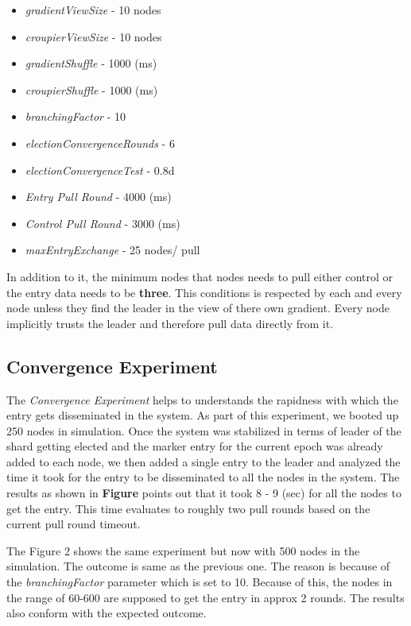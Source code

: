 \documentclass[a4paper, 11pt]{article}
\begin{document}
\begin{itemize}
\setlength\itemsep{0em}
\item \textit{gradientViewSize} - 10 nodes
\item \textit{croupierViewSize} - 10 nodes
\item \textit{gradientShuffle} - 1000 (ms)
\item \textit{croupierShuffle} - 1000 (ms)
\item \textit{branchingFactor} - 10
\item \textit{electionConvergenceRounds} - 6
\item \textit{electionConvergenceTest} - 0.8d
\item \textit{Entry Pull Round} - 4000 (ms)
\item \textit{Control Pull Round} - 3000 (ms)
\item \textit{maxEntryExchange} - 25 nodes/ pull
\end{itemize}

In addition to it, the minimum nodes that nodes needs to pull either control or the entry data needs to be \textbf{three}. This conditions is respected by each and every node unless they find the leader in the view of there own gradient. Every node implicitly trusts the leader and therefore pull data directly from it.




\subsection{Convergence Experiment}

The \textit{Convergence Experiment} helps to understands the rapidness with which the entry gets disseminated in the system. As part of this experiment, we booted up 250 nodes in simulation. Once the system was stabilized in terms of leader of the shard getting elected and the marker entry for the current epoch was already added to each node, we then added a single entry to the leader and analyzed the time it took for the entry to be disseminated to all the nodes in the system. The results as shown in \textbf{Figure} points out that it took 8 - 9 (sec) for all the nodes to get the entry. This time evaluates to roughly two pull rounds based on the current pull round timeout.


The Figure 2 shows the same experiment but now with 500 nodes in the simulation. The outcome is same as the previous one. The reason is because of the \textit{branchingFactor} parameter which is set to 10. Because of this, the nodes in the range of 60-600 are supposed to get the entry in approx 2 rounds. The results also conform with the expected outcome. 
\end{document}
